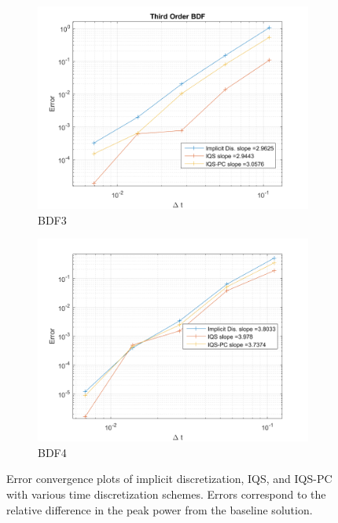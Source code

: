 \documentclass{elsarticle}
\newcommand{\iqspc}{IQS-PC\xspace}
\begin{document}
\begin{figure}[!htbp]
\begin{subfigure}[b]{0.49\textwidth}
\includegraphics[width=\linewidth]{figures/1D_conv_BDF3.png}
\caption{BDF3}
\end{subfigure}
\begin{subfigure}[b]{0.49\textwidth}
\centering
\includegraphics[width=\linewidth]{figures/1D_conv_BDF4.png}
\caption{BDF4}
\end{subfigure}
\caption{Error convergence plots of implicit discretization, IQS, and \iqspc with various time discretization schemes. Errors correspond to the relative difference in the peak power from the baseline solution.}
\label{fig:1D_conv}
\end{figure}
\end{document}
